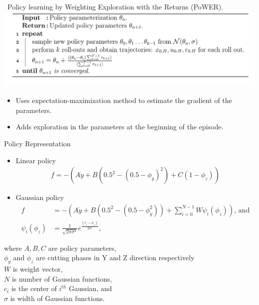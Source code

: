 \documentclass[aspectratio=43,10pt,fleqn,t]{beamer}
\begin{document}
\begin{frame}{~}{\small Policy learning by Weighting Exploration with the Returns (PoWER).}
	\includegraphics[width=\textwidth]{images/power}

\begin{itemize}
	\small 
	\item Uses expectation-maximization method to estimate the gradient of the parameters.
	\item Adds exploration in the parameters at the beginning of the episode.
\end{itemize}
\end{frame}

\begin{frame}{Policy Representation}
	\begin{itemize}
		\item Linear policy \begin{align}
		f = -(A\dot{y} + B(0.5^{2} - (0.5 - \phi_{y})^{2}) + C(1-\phi_{z}))
		\end{align}
		\item Gaussian policy 
			\begin{align}
			f &= -(A\dot{y} + B(0.5^{2} - (0.5 - \phi_{y}^{2})) + \sum_{i=0}^{N-1}W\psi_{i}(\phi_{z})) \text{, and}\\
			\psi_{i}(\phi_{z}) &= \frac{1}{\sqrt{2\pi\sigma^{2}}}e^{\frac{(c_{i} - \phi_{z})}{2\sigma^{2}}},
			\end{align}
	\end{itemize}
	\small
	where $A, B, C$ are policy parameters,\\
	$\phi_{y}$ and $\phi_{z}$ are cutting phases in Y 
	and Z direction respectively \\ 
	$W$ is weight vector, \\
	$N$ is number of Gaussian functions,\\
	$c_{i}$ is the center of $i^{th}$ Gaussian, and \\
	$\sigma$ is width of Gaussian functions.
\end{frame}
\end{document}
